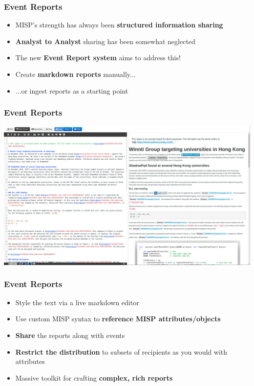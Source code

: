 \begin{frame}
\frametitle{Event Reports}
\begin{itemize}
	\item MISP's strength has always been {\bf structured information sharing}
        \item {\bf Analyst to Analyst} sharing has been somewhat neglected
        \item The new {\bf Event Report system} aims to address this!
        \item Create {\bf markdown reports} manually...
        \item ...or ingest reports as a starting point
\end{itemize}
\end{frame}

\begin{frame}
\frametitle{Event Reports}
\includegraphics[scale=0.18]{images/eventreport.png}
\end{frame}

\begin{frame}
\frametitle{Event Reports}
\begin{itemize}
	\item Style the text via a live markdown editor
        \item Use custom MISP syntax to {\bf reference MISP attributes/objects}
        \item {\bf Share} the reports along with events
        \item {\bf Restrict the distribution} to subsets of recipients as you would with attributes
        \item Massive toolkit for crafting {\bf complex, rich reports}
\end{itemize}
\end{frame}

